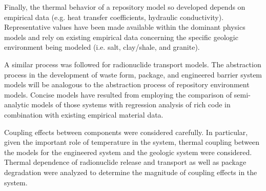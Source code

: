 
Finally, the thermal behavior of a repository model so developed depends on 
empirical data (e.g.  heat transfer coefficients, hydraulic conductivity).  
Representative values have been made available within the dominant 
physics models and rely on existing empirical data concerning the specific 
geologic environment being modeled (i.e. salt, clay/shale, and granite). 


A similar process was followed for radionuclide transport models.  The 
abstraction process in the development of waste form, package, and engineered 
barrier system models will be analogous to the abstraction process of repository 
environment models. Concise models have resulted from employing the comparison of 
semi-analytic models of those systems with regression analysis of rich code in 
combination with existing empirical material data.




Coupling effects between components were considered carefully.  In 
particular, given the important role of temperature in the system, thermal 
coupling between the models for the engineered system and the geologic system 
were considered. Thermal dependence of radionuclide release and transport as 
well as package degradation were analyzed to determine the 
magnitude of coupling effects in the system.

